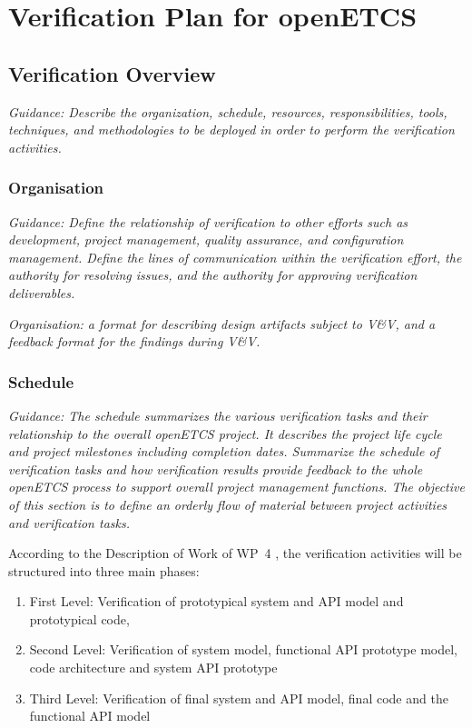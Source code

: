 \documentclass{template/openetcs_report}
\begin{document}
\section{Verification Plan for openETCS}
\label{sec:verif-plan-open}



\subsection{Verification Overview}
\label{sec:verif-overv}
\textit{Guidance: Describe the organization, schedule, resources, responsibilities, tools, techniques, and methodologies to be 
deployed in order to perform the verification activities.}


\subsubsection{Organisation}
\textit{Guidance: Define the relationship of verification to other efforts such as development, project management, quality assurance, and configuration management. Define the lines of communication within the verification effort, the authority for resolving issues, and the authority for approving verification deliverables.}

{\it Organisation: a format for describing design artifacts subject to V\&V,
  and a feedback format for the findings during V\&V.}

\subsubsection{Schedule}
\textit{Guidance: The schedule summarizes the various verification tasks
and their relationship to the overall openETCS project.
It describes the project life cycle and project milestones including completion dates.
Summarize the schedule of verification tasks and how verification results provide feedback to the whole openETCS process to support overall project management functions.
The objective of this section is to define an orderly flow of material between project activities and verification tasks.}

According to the Description of Work of WP~4 \cite{}, the verification
activities will be structured into three main phases: 
\begin{enumerate}
\item First Level: Verification of prototypical system and API model and
  prototypical code,
\item Second Level: Verification of system model, functional API prototype model, code
  architecture and system API prototype
\item Third Level: Verification of final system and API model, final
  code and the functional API model 
\end{enumerate}
\end{document}
